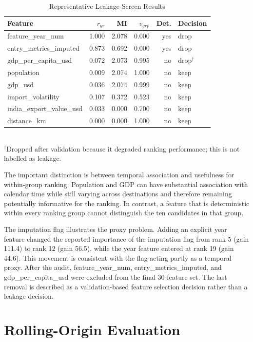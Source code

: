 \documentclass[conference]{IEEEtran}
\begin{document}
\begin{table}[t]
\caption{Representative Leakage-Screen Results}
\centering
\scriptsize
\begin{tabular}{lrrrrl}
\toprule
Feature & $r_{yr}$ & MI & $v_{grp}$ & Det. & Decision\\
\midrule
feature\_year\_num & 1.000 & 2.078 & 0.000 & yes & drop\\
entry\_metrics\_imputed & 0.873 & 0.692 & 0.000 & yes & drop\\
gdp\_per\_capita\_usd & 0.072 & 2.073 & 0.995 & no & drop$^\dagger$\\
population & 0.009 & 2.074 & 1.000 & no & keep\\
gdp\_usd & 0.036 & 2.074 & 0.999 & no & keep\\
import\_volatility & 0.107 & 0.372 & 0.523 & no & keep\\
india\_export\_value\_usd & 0.033 & 0.000 & 0.700 & no & keep\\
distance\_km & 0.000 & 0.000 & 1.000 & no & keep\\
\bottomrule
\end{tabular}
\\
\scriptsize $^\dagger$Dropped after validation because it degraded ranking performance; this is not labelled as leakage.
\end{table}

The important distinction is between temporal association and usefulness for within-group ranking. Population and GDP can have substantial association with calendar time while still varying across destinations and therefore remaining potentially informative for the ranking. In contrast, a feature that is deterministic within every ranking group cannot distinguish the ten candidates in that group.

The imputation flag illustrates the proxy problem. Adding an explicit year feature changed the reported importance of the imputation flag from rank 5 (gain 111.4) to rank 12 (gain 56.5), while the year feature entered at rank 19 (gain 44.6). This movement is consistent with the flag acting partly as a temporal proxy. After the audit, feature\_year\_num, entry\_metrics\_imputed, and gdp\_per\_capita\_usd were excluded from the final 30-feature set. The last removal is described as a validation-based feature selection decision rather than a leakage decision.

\section{Rolling-Origin Evaluation}
\end{document}

